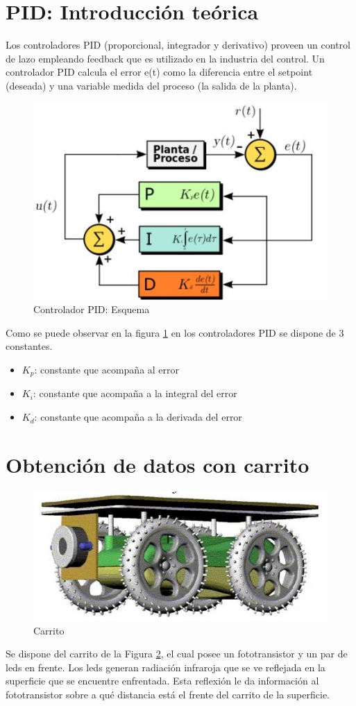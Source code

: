 \documentclass{article}
\begin{document}



\tableofcontents
\newpage

\section{PID: Introducción teórica}
Los controladores PID (proporcional, integrador y derivativo) proveen un control de lazo empleando feedback que es utilizado en la industria del control.
Un controlador PID calcula el error e(t) como la diferencia entre el setpoint (deseada) y una variable medida del proceso (la salida de la planta).


\begin{figure}[H]
\centering
\includegraphics[width=0.5\linewidth]{images/PID.jpg}
\caption{Controlador PID: Esquema}
\label{fig:PID}
\end{figure}

Como se puede observar en la figura \ref{fig:PID} en los controladores PID se dispone de 3 constantes.
\begin{itemize}
  \item $K_p$: constante que acompaña al error 
  \item $K_i$: constante que acompaña a la integral del error 
  \item $K_d$: constante que acompaña a la derivada del error
  
\end{itemize}


\newpage
\section{Obtención de datos con carrito}
\begin{figure}[H]
\centering
\includegraphics[width=0.5\linewidth]{images/carrito.JPG}
\caption{Carrito}
\label{fig:carrito}
\end{figure}
Se dispone del carrito de la Figura \ref{fig:carrito}, el cual posee un fototransistor y un par de leds en frente. Los leds generan radiación infraroja que se ve reflejada en la superficie que se encuentre enfrentada. Esta reflexión le da información al fototransistor sobre a qué distancia está el frente del carrito de la superficie. 
\end{document}
